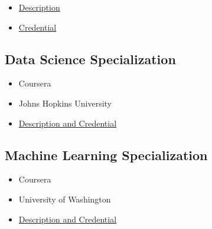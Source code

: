 \documentclass[
]{article}
\providecommand{\tightlist}{%
  \setlength{\itemsep}{0pt}\setlength{\parskip}{0pt}}
\begin{document}
\begin{itemize}
\tightlist
\item
  \href{https://aws.amazon.com/certification/certified-cloud-practitioner/}{Description}
\item
  \href{https://www.youracclaim.com/badges/32350702-5891-436d-a581-f5428aab3ad5/public_url}{Credential}
\end{itemize}

\hypertarget{data-science-specialization}{%
\subsection{Data Science
Specialization}\label{data-science-specialization}}

\begin{itemize}
\tightlist
\item
  Coursera
\item
  Johns Hopkins University
\item
  \href{https://www.coursera.org/account/accomplishments/specialization/KH5MS3AGYLHT}{Description
  and Credential}
\end{itemize}

\hypertarget{machine-learning-specialization}{%
\subsection{Machine Learning
Specialization}\label{machine-learning-specialization}}

\begin{itemize}
\tightlist
\item
  Coursera
\item
  University of Washington
\item
  \href{https://www.coursera.org/account/accomplishments/specialization/QXC4X9QML6EW}{Description
  and Credential}
\end{itemize}
\end{document}
